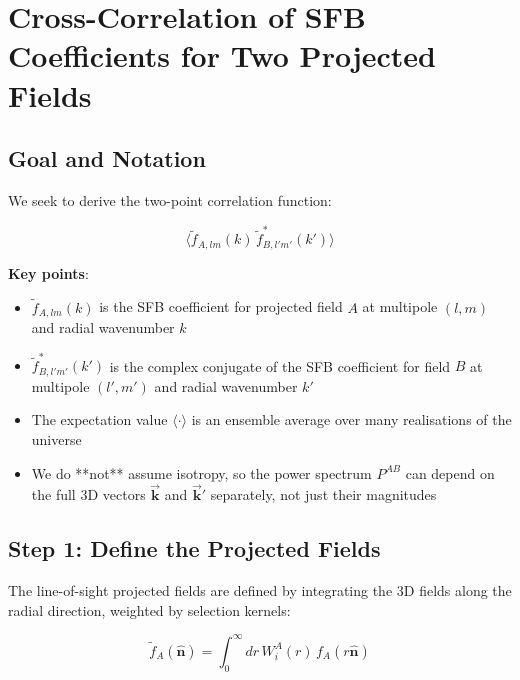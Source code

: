 
\section{Cross-Correlation of SFB Coefficients for Two Projected Fields}
\label{sec:sfb_cross_corr_general}

\subsection{Goal and Notation}

We seek to derive the two-point correlation function:

\begin{equation}
    \langle \tilde{f}_{A,lm}(k) \, \tilde{f}_{B,l'm'}^*(k') \rangle
\label{eq:goal}
\end{equation}

\textbf{Key points}:
\begin{itemize}
    \item $\tilde{f}_{A,lm}(k)$ is the SFB coefficient for projected field $A$ at multipole $(l, m)$ and radial wavenumber $k$
    \item $\tilde{f}_{B,l'm'}^*(k')$ is the complex conjugate of the SFB coefficient for field $B$ at multipole $(l', m')$ and radial wavenumber $k'$
    \item The expectation value $\langle \cdot \rangle$ is an ensemble average over many realisations of the universe
    \item We do **not** assume isotropy, so the power spectrum $P^{AB}$ can depend on the full 3D vectors $\vec{\mathbf{k}}$ and $\vec{\mathbf{k}}'$ separately, not just their magnitudes
\end{itemize}

\subsection{Step 1: Define the Projected Fields}

The line-of-sight projected fields are defined by integrating the 3D fields along the radial direction, weighted by selection kernels:

\begin{equation}
    \tilde{f}_A(\hat{\mathbf{n}}) = \int_0^{\infty} dr \, W_i^A(r) \, f_A(r \hat{\mathbf{n}})
\label{eq:proj_field_A}
\end{equation}

